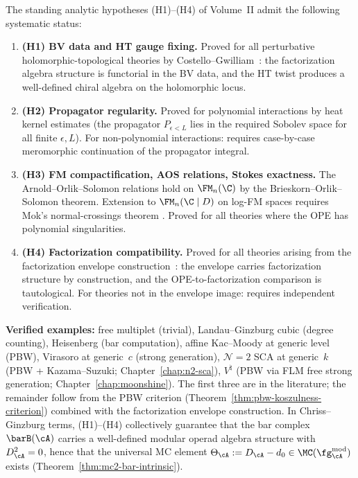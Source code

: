 \begin{remark}
\label{rem:programme-vi-verification}
\ClaimStatusConditional
{}
The standing analytic hypotheses (H1)--(H4) of Volume~II
admit the following systematic status:
\begin{enumerate}[label=\textup{(\alph*)},nosep]
\item \textbf{(H1) BV data and HT gauge fixing.}
 Proved for all perturbative holomorphic-topological theories by
 Costello--Gwilliam~\cite{CG17}: the factorization algebra structure
 is functorial in the BV data, and the HT twist produces a
 well-defined chiral algebra on the holomorphic locus.

\item \textbf{(H2) Propagator regularity.}
 Proved for polynomial interactions by heat kernel estimates
 (the propagator $P_{\epsilon < L}$ lies in the required Sobolev
 space for all finite $\epsilon, L$).
 For non-polynomial interactions: requires case-by-case meromorphic
 continuation of the propagator integral.

\item \textbf{(H3) FM compactification, AOS relations, Stokes
 exactness.}
 The Arnold--Orlik--Solomon relations hold on $\FM_n(\C)$ by the
 Brieskorn--Orlik--Solomon theorem. Extension to $\FM_n(\C \mid D)$
 on log-FM spaces requires Mok's normal-crossings theorem
 \cite[Thm~3.3.1]{Mok25}. Proved for all theories where the OPE
 has polynomial singularities.

\item \textbf{(H4) Factorization compatibility.}
 Proved for all theories arising from the factorization
 envelope construction~\cite[\S3.7]{BD04}\cite{CG17}: the envelope carries
 factorization structure by construction, and the OPE-to-factorization
 comparison is tautological. For theories not in the envelope image:
 requires independent verification.
\end{enumerate}

\noindent\textbf{Verified examples:}
free multiplet (trivial), Landau--Ginzburg cubic (degree counting),
Heisenberg (bar computation), affine Kac--Moody at generic
level (PBW), Virasoro at generic~$c$ (strong generation),
$\mathcal{N}{=}2$ SCA at generic~$k$ (PBW + Kazama--Suzuki;
Chapter~\ref{chap:n2-sca}),
$V^\natural$ (PBW via FLM free strong generation;
Chapter~\ref{chap:moonshine}).
The first three are in the literature; the remainder follow from the
PBW criterion
(Theorem~\ref{thm:pbw-koszulness-criterion}) combined with the
factorization envelope construction.
In Chriss--Ginzburg terms, (H1)--(H4) collectively guarantee that the bar complex $\barB(\cA)$ carries a well-defined modular operad algebra structure with $D_\cA^2 = 0$, hence that the universal MC element $\Theta_\cA := D_\cA - d_0 \in \MC(\fg^{\mathrm{mod}}_\cA)$ exists (Theorem~\ref{thm:mc2-bar-intrinsic}).


\end{remark}
